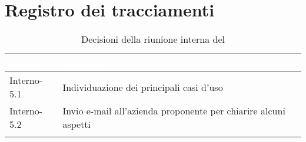 \section{Registro dei tracciamenti}
{
\renewcommand{\arraystretch}{1.5}
\centering
\begin{longtable}{C{3cm} C{9cm}}
\textcolor{white}{\textbf{Codice}}&
\textcolor{white}{\textbf{Decisione}}\\	
\endhead
		
Interno-5.1 & Individuazione dei principali casi d'uso\\
Interno-5.2 & Invio e-mail all'azienda proponente per chiarire alcuni aspetti\\

\caption{Decisioni della riunione interna del \Data{}}
		
\end{longtable}
}
